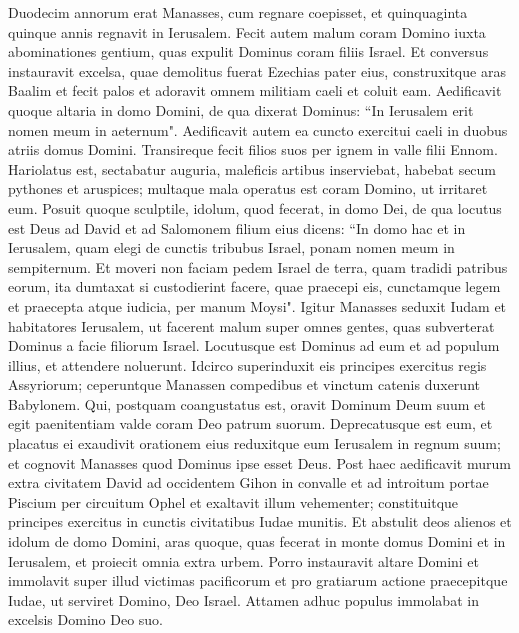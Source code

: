 \begin{biblechapter}  
\verse Duodecim annorum erat Manasses, cum regnare coepisset, et quinquaginta quinque annis regnavit in Ierusalem. 
\verse Fecit autem malum coram Domino iuxta abominationes gentium, quas expulit Dominus coram filiis Israel. 
\verse Et conversus instauravit excelsa, quae demolitus fuerat Ezechias pater eius, construxitque aras Baalim et fecit palos et adoravit omnem militiam caeli et coluit eam. 
\verse Aedificavit quoque altaria in domo Domini, de qua dixerat Dominus: “In Ierusalem erit nomen meum in aeternum". 
\verse Aedificavit autem ea cuncto exercitui caeli in duobus atriis domus Domini. 
\verse Transireque fecit filios suos per ignem in valle filii Ennom. Hariolatus est, sectabatur auguria, maleficis artibus inserviebat, habebat secum pythones et aruspices; multaque mala operatus est coram Domino, ut irritaret eum. 
\verse Posuit quoque sculptile, idolum, quod fecerat, in domo Dei, de qua locutus est Deus ad David et ad Salomonem filium eius dicens: “In domo hac et in Ierusalem, quam elegi de cunctis tribubus Israel, ponam nomen meum in sempiternum. 
\verse Et moveri non faciam pedem Israel de terra, quam tradidi patribus eorum, ita dumtaxat si custodierint facere, quae praecepi eis, cunctamque legem et praecepta atque iudicia, per manum Moysi". 
\verse Igitur Manasses seduxit Iudam et habitatores Ierusalem, ut facerent malum super omnes gentes, quas subverterat Dominus a facie filiorum Israel. 
\verse Locutusque est Dominus ad eum et ad populum illius, et attendere noluerunt. 
\verse Idcirco superinduxit eis principes exercitus regis Assyriorum; ceperuntque Manassen compedibus et vinctum catenis duxerunt Babylonem. 
\verse Qui, postquam coangustatus est, oravit Dominum Deum suum et egit paenitentiam valde coram Deo patrum suorum. 
\verse Deprecatusque est eum, et placatus ei exaudivit orationem eius reduxitque eum Ierusalem in regnum suum; et cognovit Manasses quod Dominus ipse esset Deus. 
\verse Post haec aedificavit murum extra civitatem David ad occidentem Gihon in convalle et ad introitum portae Piscium per circuitum Ophel et exaltavit illum vehementer; constituitque principes exercitus in cunctis civitatibus Iudae munitis. 
\verse Et abstulit deos alienos et idolum de domo Domini, aras quoque, quas fecerat in monte domus Domini et in Ierusalem, et proiecit omnia extra urbem. 
\verse Porro instauravit altare Domini et immolavit super illud victimas pacificorum et pro gratiarum actione praecepitque Iudae, ut serviret Domino, Deo Israel. 
\verse Attamen adhuc populus immolabat in excelsis Domino Deo suo. 

\end{biblechapter}
